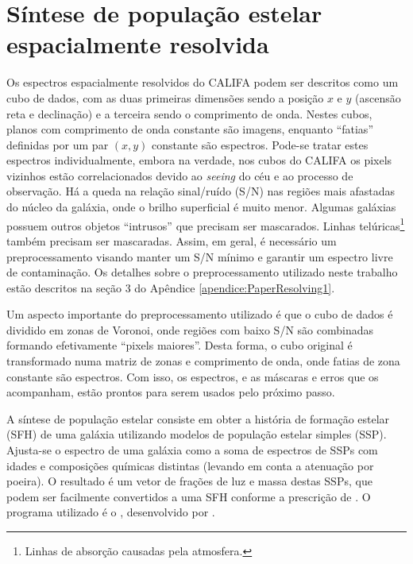 
\section{Síntese de população estelar espacialmente resolvida}
\label{sec:Intro:Sintese}

Os espectros espacialmente resolvidos do CALIFA podem ser descritos como um cubo
de dados, com as duas primeiras dimensões sendo a posição $x$ e $y$ (ascensão
reta e declinação) e a terceira sendo o comprimento de onda. Nestes cubos,
planos com comprimento de onda constante são imagens, enquanto ``fatias''
definidas por um par $(x, y)$ constante são espectros. Pode-se tratar estes
espectros individualmente, embora na verdade, nos cubos do CALIFA os pixels
vizinhos estão correlacionados devido ao {\em seeing} do céu e ao processo de
observação. Há a queda na relação sinal/ruído (S/N) nas regiões mais afastadas
do núcleo da galáxia, onde o brilho superficial é muito menor.
Algumas galáxias possuem outros objetos ``intrusos'' que precisam ser
mascarados. Linhas telúricas\footnote{Linhas de absorção causadas pela
atmosfera.} também precisam ser mascaradas. Assim, em geral, é necessário um
preprocessamento visando manter um S/N mínimo e garantir um espectro livre de
contaminação. Os detalhes sobre o preprocessamento utilizado neste trabalho
estão descritos na seção 3 do Apêndice \ref{apendice:PaperResolving1}.

Um aspecto importante do preprocessamento utilizado é que o cubo de dados é
dividido em zonas de Voronoi, onde regiões com baixo S/N são combinadas formando
efetivamente ``pixels maiores''. Desta forma, o cubo original é transformado
numa matriz de zonas e comprimento de onda, onde fatias de zona constante são
espectros. Com isso, os espectros, e as máscaras e erros que os acompanham,
estão prontos para serem usados pelo próximo passo.

A síntese de população estelar consiste em obter a história de formação estelar
(SFH) de uma galáxia utilizando modelos de população estelar simples (SSP).
Ajusta-se o espectro de uma galáxia como a soma de espectros de SSPs com idades
e composições químicas distintas (levando em conta a atenuação por poeira). O
resultado é um vetor de frações de luz e massa destas SSPs, que podem ser
facilmente convertidos a uma SFH conforme a prescrição de \cite{Asari2007}.
O programa utilizado é o \starlight, desenvolvido por \cite{CidFernandes2005}.

